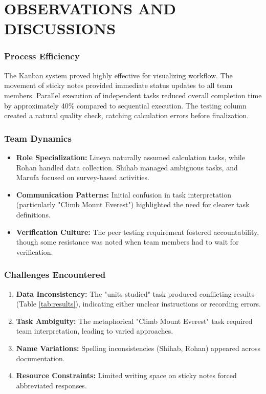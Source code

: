 \chapter{OBSERVATIONS AND DISCUSSIONS}\label{ch:experimental_result}
\subsection{Process Efficiency}
The Kanban system proved highly effective for visualizing workflow. The movement of sticky notes provided immediate status updates to all team members. Parallel execution of independent tasks reduced overall completion time by approximately 40\% compared to sequential execution. The testing column created a natural quality check, catching calculation errors before finalization.

\subsection{Team Dynamics}
\begin{itemize}
    \item \textbf{Role Specialization:} Lineya naturally assumed calculation tasks, while Rohan handled data collection. Shihab managed ambiguous tasks, and Marufa focused on survey-based activities.
    \item \textbf{Communication Patterns:} Initial confusion in task interpretation (particularly "Climb Mount Everest") highlighted the need for clearer task definitions.
    \item \textbf{Verification Culture:} The peer testing requirement fostered accountability, though some resistance was noted when team members had to wait for verification.
\end{itemize}

\subsection{Challenges Encountered}
\begin{enumerate}
    \item \textbf{Data Inconsistency:} The "units studied" task produced conflicting results (Table \ref{tab:results}), indicating either unclear instructions or recording errors.
    \item \textbf{Task Ambiguity:} The metaphorical "Climb Mount Everest" task required team interpretation, leading to varied approaches.
    \item \textbf{Name Variations:} Spelling inconsistencies (Shihab, Rohan) appeared across documentation.
    \item \textbf{Resource Constraints:} Limited writing space on sticky notes forced abbreviated responses.
\end{enumerate}

